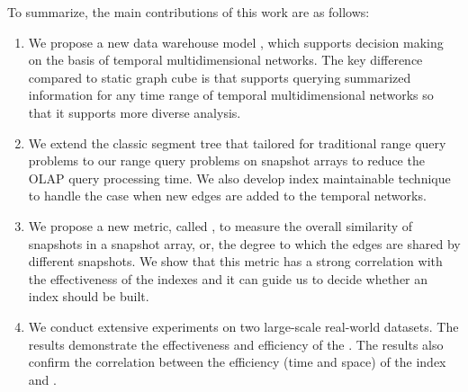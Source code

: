 \documentclass[10pt,journal,compsoc]{IEEEtran}
\begin{document}
To summarize, the main contributions of this work are as follows:
\begin{enumerate}
	\item We propose a new data warehouse model   , which supports decision making on the basis of temporal multidimensional networks. The key difference compared to static graph cube is that    supports querying summarized information for any time range of temporal multidimensional networks so that it supports more diverse analysis.
	
	\item We extend the classic segment tree that tailored for traditional range query problems to our range query problems on snapshot arrays to reduce the OLAP query processing time. We also develop  index maintainable technique to handle the case when new edges are added to the temporal networks. %
	
	\item  We propose a new metric, called , to measure the overall similarity of snapshots in a snapshot array, or, the degree to which the edges are shared by different snapshots. We show that this metric has a strong correlation with the effectiveness of the indexes and it can guide us to decide whether an index should be built.

	
	
	\item We conduct extensive experiments on two large-scale real-world datasets. The results demonstrate the effectiveness and efficiency of the . The results also confirm the correlation between the efficiency (time and space) of the index and . %
\end{enumerate}
\end{document}

